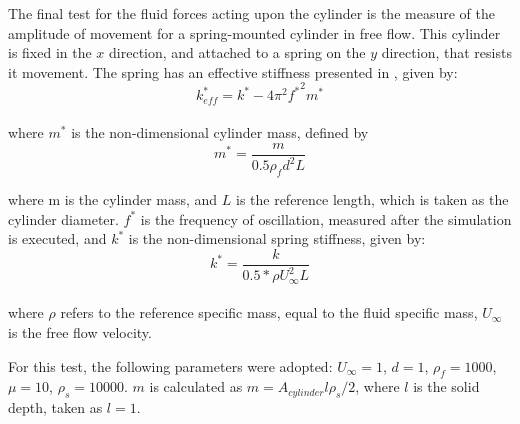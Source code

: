 \documentclass{article}
\begin{document}
The final test for the fluid forces acting upon the cylinder is the measure of the amplitude of movement for a spring-mounted cylinder in free flow. This cylinder is fixed in the $x$ direction, and attached to a spring on the $y$ direction, that resists it movement. The spring has an effective stiffness presented in \citeauthor{shiels2001} \cite{shiels2001}, given by: \\

\begin{equation}
    k^*_{eff} = k^* - 4\pi^2 {f^*}^2 m^*
\end{equation} \\

\noindent where $m^*$ is the non-dimensional cylinder mass, defined by \\

\begin{equation}
	m^* = \frac{m}{0.5 \rho_f d^2 L}
\end{equation}

\noindent where m is the cylinder mass, and $L$ is the reference length, which is taken as the cylinder diameter. $f^*$ is the frequency of oscillation, measured after the simulation is executed, and $k^*$ is the non-dimensional spring stiffness, given by: \\

\begin{equation}
	k^* = \frac{k}{0.5* \rho U_{\infty}^2 L }
\end{equation} \\

\noindent where $\rho$ refers to the reference specific mass, equal to the fluid specific mass, $U_{\infty}$ is the free flow velocity.

For this test, the following parameters were adopted: $U_{\infty} = 1$, $d=1$, $\rho_f=1000$, $\mu=10$, $\rho_s = 10000$. $m$ is calculated as $m= A_{cylinder} l \rho_s / 2$, where $l$ is the solid depth, taken as $l=1$.
\end{document}
